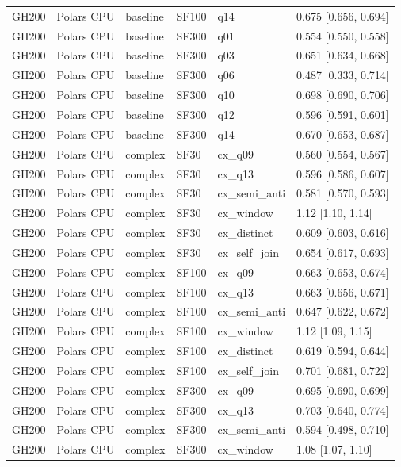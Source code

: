 \begin{longtable}{llllll}
GH200 & Polars CPU & baseline & SF100 & q14 & 0.675 [0.656, 0.694] \\
GH200 & Polars CPU & baseline & SF300 & q01 & 0.554 [0.550, 0.558] \\
GH200 & Polars CPU & baseline & SF300 & q03 & 0.651 [0.634, 0.668] \\
GH200 & Polars CPU & baseline & SF300 & q06 & 0.487 [0.333, 0.714] \\
GH200 & Polars CPU & baseline & SF300 & q10 & 0.698 [0.690, 0.706] \\
GH200 & Polars CPU & baseline & SF300 & q12 & 0.596 [0.591, 0.601] \\
GH200 & Polars CPU & baseline & SF300 & q14 & 0.670 [0.653, 0.687] \\
GH200 & Polars CPU & complex & SF30 & cx\_q09 & 0.560 [0.554, 0.567] \\
GH200 & Polars CPU & complex & SF30 & cx\_q13 & 0.596 [0.586, 0.607] \\
GH200 & Polars CPU & complex & SF30 & cx\_semi\_anti & 0.581 [0.570, 0.593] \\
GH200 & Polars CPU & complex & SF30 & cx\_window & 1.12 [1.10, 1.14] \\
GH200 & Polars CPU & complex & SF30 & cx\_distinct & 0.609 [0.603, 0.616] \\
GH200 & Polars CPU & complex & SF30 & cx\_self\_join & 0.654 [0.617, 0.693] \\
GH200 & Polars CPU & complex & SF100 & cx\_q09 & 0.663 [0.653, 0.674] \\
GH200 & Polars CPU & complex & SF100 & cx\_q13 & 0.663 [0.656, 0.671] \\
GH200 & Polars CPU & complex & SF100 & cx\_semi\_anti & 0.647 [0.622, 0.672] \\
GH200 & Polars CPU & complex & SF100 & cx\_window & 1.12 [1.09, 1.15] \\
GH200 & Polars CPU & complex & SF100 & cx\_distinct & 0.619 [0.594, 0.644] \\
GH200 & Polars CPU & complex & SF100 & cx\_self\_join & 0.701 [0.681, 0.722] \\
GH200 & Polars CPU & complex & SF300 & cx\_q09 & 0.695 [0.690, 0.699] \\
GH200 & Polars CPU & complex & SF300 & cx\_q13 & 0.703 [0.640, 0.774] \\
GH200 & Polars CPU & complex & SF300 & cx\_semi\_anti & 0.594 [0.498, 0.710] \\
GH200 & Polars CPU & complex & SF300 & cx\_window & 1.08 [1.07, 1.10] \\

\end{longtable}

